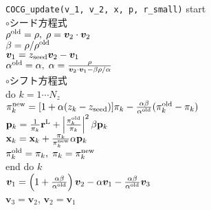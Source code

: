 \documentclass[12pt,titlepage]{jarticle}
\renewenvironment{leftbar}{%
  \def\FrameCommand{\vrule width 1pt \hspace{0pt}}%
  \MakeFramed {\advance\hsize-\width \FrameRestore}}%
 {\endMakeFramed}
\begin{document}
\begin{leftbar}
  \noindent
  \hspace{0.5cm}
  \verb|COCG_update(v_1, v_2, x, p, r_small)| start
  \\\hspace{1.0cm}
  $\circ$シード方程式
  \\\hspace{1.0cm}
  $\rho^{\rm old} = \rho,\; \rho = {\boldsymbol v}_2 \cdot {\boldsymbol v}_2$
  \\\hspace{1.0cm}
  $\beta = \rho / \rho^{\rm old}$
  \\\hspace{1.0cm}
  ${\boldsymbol v}_1 = z_{\rm seed} {\boldsymbol v}_2 - {\boldsymbol v}_1$
  \\\hspace{1.0cm}
  $\alpha^{\rm old} = \alpha,\; 
  \alpha = \frac{\rho}{{\boldsymbol v}_2 \cdot {\boldsymbol v}_1 - \beta \rho / \alpha }$
  \\\hspace{1.0cm}
  $\circ$シフト方程式
  \\\hspace{1.0cm}
  do $k = 1 \cdots N_z$
  \\\hspace{1.5cm}
  $\pi_k^{\rm new} = [1+\alpha(z_k-z_{\rm seed})]\pi_k - \frac{\alpha \beta}{\alpha^{\rm old}}(\pi_k^{\rm old} - \pi_k)$
  \\\hspace{1.5cm}
  ${\bf p}_{k} = \frac{1}{\pi_k} {\bf r}^{\rm L} + 
  \left|\frac{\pi^{\rm old}_k}{\pi_k } \right|^2 \beta {\bf p}_{k}$
  \\\hspace{1.5cm}
  ${\bf x}_{k} = {\bf x}_{k} + \frac{\pi_k}{\pi_k^{\rm new}} \alpha {\bf p}_{k}$
  \\\hspace{1.5cm}
  $\pi_k^{\rm old} = \pi_k,\; \pi_k = \pi_k^{\rm new}$
  \\\hspace{1.0cm}
  end do $k$
  \\\hspace{1.0cm}
  ${\boldsymbol v}_1 = \left( 1 + \frac{\alpha \beta}{\alpha^{\rm old}} \right) {\boldsymbol v}_2
  - \alpha {\boldsymbol v}_1 - \frac{\alpha \beta}{\alpha^{\rm old}} {\boldsymbol v}_3$
  \\\hspace{1.0cm}
  ${\boldsymbol v}_3 = {\boldsymbol v}_2$,
  ${\boldsymbol v}_2 = {\boldsymbol v}_1$

\end{leftbar}
\end{document}
